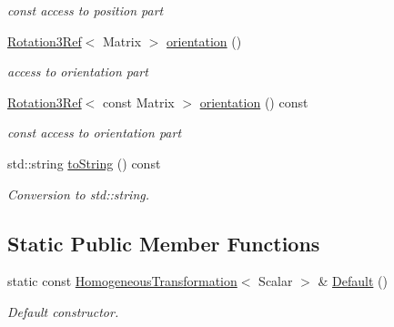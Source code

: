 \begin{DoxyCompactItemize}
\begin{DoxyCompactList}\small\item\em const access to position part \end{DoxyCompactList}\item 
\hyperlink{classow__core_1_1Rotation3Ref}{Rotation3\+Ref}$<$ Matrix $>$ \hyperlink{classow__core_1_1HomogeneousTransformation_aae6ef9088cc07bfa5e3b76de5b2f9ede}{orientation} ()\hypertarget{classow__core_1_1HomogeneousTransformation_aae6ef9088cc07bfa5e3b76de5b2f9ede}{}\label{classow__core_1_1HomogeneousTransformation_aae6ef9088cc07bfa5e3b76de5b2f9ede}

\begin{DoxyCompactList}\small\item\em access to orientation part \end{DoxyCompactList}\item 
\hyperlink{classow__core_1_1Rotation3Ref}{Rotation3\+Ref}$<$ const Matrix $>$ \hyperlink{classow__core_1_1HomogeneousTransformation_ab2dcd67527042fd99a7f47f539497cb8}{orientation} () const \hypertarget{classow__core_1_1HomogeneousTransformation_ab2dcd67527042fd99a7f47f539497cb8}{}\label{classow__core_1_1HomogeneousTransformation_ab2dcd67527042fd99a7f47f539497cb8}

\begin{DoxyCompactList}\small\item\em const access to orientation part \end{DoxyCompactList}\item 
std\+::string \hyperlink{classow__core_1_1HomogeneousTransformation_a81377744bf29c6001680abdcd0f22f95}{to\+String} () const \hypertarget{classow__core_1_1HomogeneousTransformation_a81377744bf29c6001680abdcd0f22f95}{}\label{classow__core_1_1HomogeneousTransformation_a81377744bf29c6001680abdcd0f22f95}

\begin{DoxyCompactList}\small\item\em Conversion to std\+::string. \end{DoxyCompactList}\end{DoxyCompactItemize}
\subsection*{Static Public Member Functions}
\begin{DoxyCompactItemize}
\item 
static const \hyperlink{classow__core_1_1HomogeneousTransformation}{Homogeneous\+Transformation}$<$ Scalar $>$ \& \hyperlink{classow__core_1_1HomogeneousTransformation_a7113d1a0875f4c8583321a7f3aeb7740}{Default} ()
\begin{DoxyCompactList}\small\item\em Default constructor. \end{DoxyCompactList}\end{DoxyCompactItemize}


